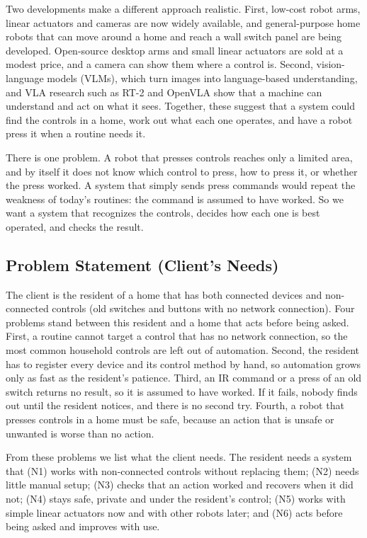 \documentclass[conference]{IEEEtran}
\begin{document}
Two developments make a different approach realistic. First, low-cost robot arms, linear actuators and cameras are now widely available, and general-purpose home robots that can move around a home and reach a wall switch panel are being developed. Open-source desktop arms and small linear actuators are sold at a modest price, and a camera can show them where a control is. Second, vision-language models (VLMs), which turn images into language-based understanding, and VLA research such as RT-2 and OpenVLA show that a machine can understand and act on what it sees. Together, these suggest that a system could find the controls in a home, work out what each one operates, and have a robot press it when a routine needs it.

There is one problem. A robot that presses controls reaches only a limited area, and by itself it does not know which control to press, how to press it, or whether the press worked. A system that simply sends press commands would repeat the weakness of today's routines: the command is assumed to have worked. So we want a system that recognizes the controls, decides how each one is best operated, and checks the result.

\subsection{Problem Statement (Client's Needs)}
The client is the resident of a home that has both connected devices and non-connected controls (old switches and buttons with no network connection). Four problems stand between this resident and a home that acts before being asked. First, a routine cannot target a control that has no network connection, so the most common household controls are left out of automation. Second, the resident has to register every device and its control method by hand, so automation grows only as fast as the resident's patience. Third, an IR command or a press of an old switch returns no result, so it is assumed to have worked. If it fails, nobody finds out until the resident notices, and there is no second try. Fourth, a robot that presses controls in a home must be safe, because an action that is unsafe or unwanted is worse than no action.

From these problems we list what the client needs. The resident needs a system that (N1) works with non-connected controls without replacing them; (N2) needs little manual setup; (N3) checks that an action worked and recovers when it did not; (N4) stays safe, private and under the resident's control; (N5) works with simple linear actuators now and with other robots later; and (N6) acts before being asked and improves with use.
\end{document}

